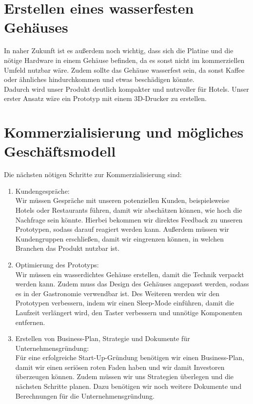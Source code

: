 \section{Erstellen eines wasserfesten Gehäuses}
In naher Zukunft ist es außerdem noch wichtig, dass sich die Platine und die nötige Hardware in einem Gehäuse befinden, da es sonst nicht im kommerziellen Umfeld nutzbar wäre. Zudem sollte das Gehäuse wasserfest sein, da sonst Kaffee oder ähnliches hindurchkommen und etwas beschädigen könnte.\\

\noindent
Dadurch wird unser Produkt deutlich kompakter und nutzvoller für Hotels. Unser erster Ansatz wäre ein Prototyp mit einem 3D-Drucker zu erstellen. 
\section{Kommerzialisierung und mögliches Geschäftsmodell}
Die nächsten nötigen Schritte zur Kommerzialisierung sind:
\begin{enumerate}
    \item Kundengespräche:\\
    Wir müssen Gespräche mit unseren potenziellen Kunden, beispielsweise Hotels oder Restaurants führen, damit wir abschätzen können, wie hoch die Nachfrage sein könnte. Hierbei bekommen wir direktes Feedback zu unseren Prototypen, sodass darauf reagiert werden kann. Außerdem müssen wir Kundengruppen erschließen, damit wir eingrenzen können, in welchen Branchen das Produkt nutzbar ist.
    \item Optimierung des Prototyps:\\
    Wir müssen ein wasserdichtes Gehäuse erstellen, damit die Technik verpackt werden kann. Zudem muss das Design des Gehäuses angepasst werden, sodass es in der Gastronomie verwendbar ist. Des Weiteren werden wir den Prototypen verbessern, indem wir einen Sleep-Mode einführen, damit die Laufzeit verlängert wird, den Taster verbessern und unnötige Komponenten entfernen.
    \item Erstellen von Business-Plan, Strategie und Dokumente für Unternehmensgründung:\\
    Für eine erfolgreiche Start-Up-Gründung benötigen wir einen Business-Plan, damit wir einen seriösen roten Faden haben und wir damit Investoren überzeugen können. Zudem müssen wir uns Strategien überlegen und die nächsten Schritte planen. Dazu benötigen wir noch weitere Dokumente und Berechnungen für die Unternehmensgründung.
\end{enumerate}

